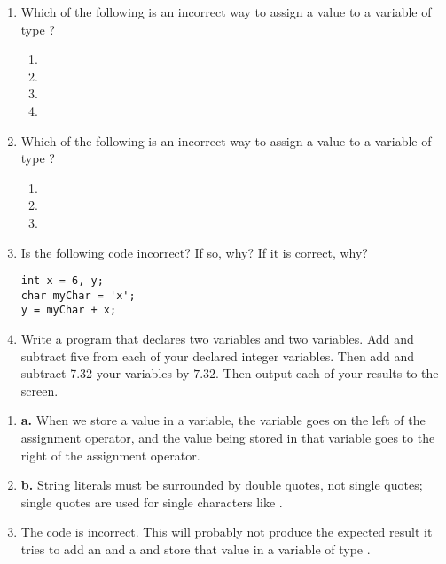 \begin{enumerate}
	\item Which of the following is an incorrect way to assign a value to a variable  of type ?
	\begin{enumerate}
	  \item {}
		\item {}
		\item {}
		\item {}
	\end{enumerate}

	\item Which of the following is an incorrect way to assign a value to a variable of type ?
	\begin{enumerate}
		\item {}
		\item {}
		\item {}
	\end{enumerate}

 \item Is the following code incorrect? If so, why? If it is correct, why?

\noindent\begin{minipage}{\linewidth}\begin{lstlisting}
int x = 6, y;
char myChar = 'x';
y = myChar + x;
\end{lstlisting}\end{minipage}

  \item Write a program that declares two  variables and two  variables. 
  Add and subtract five from each of your declared integer variables. 
  Then add and subtract 7.32 your  variables by $7.32$. 
  Then output each of your results to the screen. 
\end{enumerate}


\begin{enumerate}
	\item \textbf{a.} When we store a value in a variable, the variable goes on the left of the assignment operator, and the value being stored in that variable goes to the right of the assignment operator.

  \item \textbf{b.} String literals must be surrounded by double quotes, not single quotes; single quotes are used for single characters like .

  \item The code is incorrect. This will probably not produce the expected result it tries to add an  and a  and store that value in a variable of type .

\end{enumerate}

\begin{comment}
\LevelD{Further Reading}

\begin{itemize}
\item ~
\item ~
\item ~
\end{itemize}	
\end{comment}